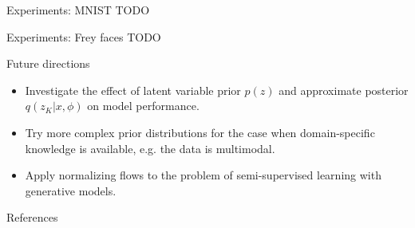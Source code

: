 \documentclass[unicode,11pt]{beamer}
\begin{document}
\begin{frame}[fragile]{Experiments: MNIST}
  TODO
\end{frame}


\begin{frame}[fragile]{Experiments: Frey faces}
  TODO
\end{frame}


\begin{frame}[fragile]{Future directions}
  \begin{itemize}
  \item Investigate the effect of latent variable prior $p(z)$ and approximate
    posterior $q(z_K|x, \phi)$ on model performance.
  \item Try more complex prior distributions for the case when domain-specific
    knowledge is available, e.g. the data is multimodal.
  \item Apply normalizing flows to the problem of semi-supervised learning
    with generative models.
  \end{itemize}
\end{frame}


\begin{frame}[noframenumbering]{References}
  
  
\end{frame}
\end{document}
